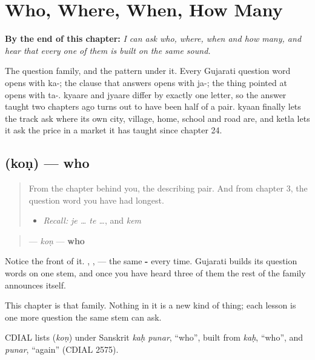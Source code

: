 
\chapter{Who, Where, When, How Many}
\label{ch:gu-question-words}

\begin{chapteropening}
\textbf{By the end of this chapter:} \emph{I can ask who, where, when and how many, and hear that every one of them is built on the same sound.}

The question family, and the pattern under it. Every Gujarati question word opens with ka-; the clause that answers opens with ja-; the thing pointed at opens with ta-. kyaare and jyaare differ by exactly one letter, so the answer taught two chapters ago turns out to have been half of a pair. kyaan finally lets the track ask where its own city, village, home, school and road are, and ketla lets it ask the price in a market it has taught since chapter 24.
\end{chapteropening}

\section[\texorpdfstring{\gu{કોણ} (koṇ)}{કોણ (koṇ)}]{ (koṇ) — who}

\label{lesson:GU-C37-kon}



\begin{quote}
From the chapter behind you, the describing pair. And from chapter 3, the question word you have had longest.

\begin{itemize}
\raggedright
  \item \emph{Recall:} \emph{je … te …}, and \emph{kem}
\end{itemize}
\end{quote}

\begin{cousinweb}
\begin{quote}
\textbf{} — \emph{koṇ} — \textbf{who}
\end{quote}

Notice the front of it. \textbf{}, \textbf{}, \textbf{} — the same \textbf{-} every time. Gujarati builds its question words on one stem, and once you have heard three of them the rest of the family announces itself.

This chapter is that family. Nothing in it is a new kind of thing; each lesson is one more question the same stem can ask.

CDIAL lists \textbf{} (\emph{koṇ}) under Sanskrit \emph{kaḥ punar}, \textquotedblleft{}who\textquotedblright{}, built from \emph{kaḥ}, \textquotedblleft{}who\textquotedblright{}, and \emph{punar}, \textquotedblleft{}again\textquotedblright{} (CDIAL 2575).
\end{cousinweb}

